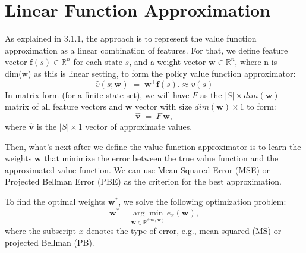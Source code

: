 \section{Linear Function Approximation}
As explained in 3.1.1, the approach is to represent the value function approximation as a linear combination of features. For that, we define feature vector \(\mathbf{f}(s) \in \mathbb{R}^n\) for each state \(s\), and a weight vector \(\mathbf{w} \in \mathbb{R}^n\), where n is dim(w) as this is linear setting, to form the policy value function approximator:
\[
\hat{v}(s;\mathbf{w}) \;=\; \mathbf{w}^\top \mathbf{f}(s). \approx v(s)
\]
In matrix form (for a finite state set), we will have \(F\) as the \(|S|\times dim(\mathbf{w})\) matrix of all feature vectors and \(\mathbf{w}\) vector with size \(dim(\mathbf{w})\times 1\) to form:
\[
\hat{\mathbf{v}} \;=\; F \,\mathbf{w},
\]
where \(\hat{\mathbf{v}}\) is the \(|S|\times 1\) vector of approximate values.

Then, what's next after we define the value function approximator is to learn the weights \(\mathbf{w}\) that minimize the error between the true value function and the approximated value function. We can use Mean Squared Error (MSE) or Projected Bellman Error (PBE) as the criterion for the best approximation.

To find the optimal weights \(\mathbf{w}^*\), we solve the following optimization problem:
\[
\mathbf{w}^* = \underset{\mathbf{w} \in \mathbb{R}^{\text{dim}(\mathbf{w})}}{\arg\min} \, e_x(\mathbf{w}),
\]
where the subscript \(x\) denotes the type of error, e.g., mean squared (MS) or projected Bellman (PB).


